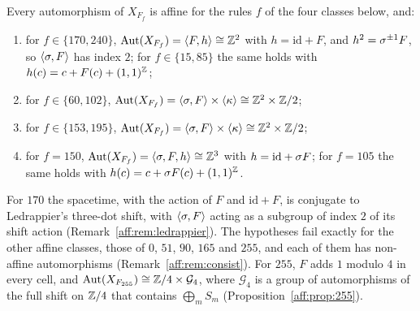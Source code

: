 \begin{theorem}\label{thm:affine}
Every automorphism of $X_{F_f}$ is affine for the rules $f$ of the four classes below, and:
\begin{enumerate}
\item for $f\in\{170,240\}$, $\operatorname{Aut}(X_{F_f})=\langle F,h\rangle\cong\mathbb{Z}^2$ with $h=\mathrm{id}+F$, and $h^2=\sigma^{\pm1}F$, so $\langle\sigma,F\rangle$ has index $2$; for $f\in\{15,85\}$ the same holds with $h(c)=c+F(c)+(1,1)^{\mathbb{Z}}$;
\item for $f\in\{60,102\}$, $\operatorname{Aut}(X_{F_f})=\langle\sigma,F\rangle\times\langle\kappa\rangle\cong\mathbb{Z}^2\times\mathbb{Z}/2$;
\item for $f\in\{153,195\}$, $\operatorname{Aut}(X_{F_f})=\langle\sigma,F\rangle\times\langle\kappa\rangle\cong\mathbb{Z}^2\times\mathbb{Z}/2$;
\item for $f=150$, $\operatorname{Aut}(X_{F_f})=\langle\sigma,F,h\rangle\cong\mathbb{Z}^3$ with $h=\mathrm{id}+\sigma F$; for $f=105$ the same holds with $h(c)=c+\sigma F(c)+(1,1)^{\mathbb{Z}}$.
\end{enumerate}
\end{theorem}

For $170$ the spacetime, with the action of $F$ and $\mathrm{id}+F$, is conjugate to Ledrappier's three-dot shift, with $\langle\sigma,F\rangle$ acting as a subgroup of index $2$ of its shift action (Remark~\ref{aff:rem:ledrappier}). The hypotheses fail exactly for the other affine classes, those of $0$, $51$, $90$, $165$ and $255$, and each of them has non-affine automorphisms (Remark~\ref{aff:rem:consist}). For $255$, $F$ adds $1$ modulo $4$ in every cell, and $\operatorname{Aut}(X_{F_{255}})\cong\mathbb{Z}/4\times\mathcal G_4$, where $\mathcal G_4$ is a group of automorphisms of the full shift on $\mathbb{Z}/4$ that contains $\bigoplus_mS_m$ (Proposition~\ref{aff:prop:255}).

